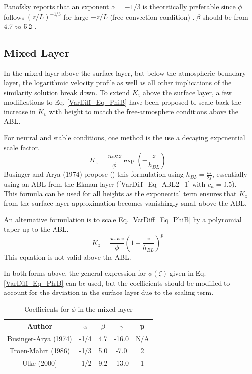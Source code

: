 Panofsky reports that an exponent $\alpha=-1/3$ is theoretically preferable
since $\phi$ follows $(z/L)^{-1/3}$ for large $-z/L$ (free-convection condition) \cite[p.134]{Panofsky1984}.
$\beta$ should be from 4.7 to 5.2 \cite[p.136]{Panofsky1984}.

\subsection{Mixed Layer}
In the mixed layer above the surface layer, but below the atmospheric boundary layer,
the logarithmic velocity profile as well as all other implications of the similarity
solution break down. To extend $K_v$ above the surface layer, a few modifications to
Eq. \ref{VarDiff_Eq_PhiB} have been proposed to scale back the increase in $K_v$ with
height to match the free-atmosphere conditions above the ABL.

For neutral and stable conditions, one method is the use a decaying exponential scale
factor.
\begin{equation}\label{VarDiff_Eq_Kz_Mixed_Exp}
K_z = \frac{u_{*} \kappa z}{\phi} \exp \left( -\frac{z}{h_{BL}} \right)
\end{equation}
Businger and Arya (1974) propose (\cite[p.872]{Seinfeld2006})
this formulation using $h_{BL}=\frac{u_*}{2 f}$, essentially
using an ABL from the Ekman layer (\ref{VarDiff_Eq_ABL2_1} with $c_n=0.5$).
This formula can be used for all heights as the exponential
term ensures that $K_z$ from the surface layer approximation becomes vanishingly
small above the ABL.

An alternative formulation is to scale Eq. \ref{VarDiff_Eq_PhiB} by a polynomial taper
up to the ABL.
\begin{equation}\label{VarDiff_Eq_Kz_Mixed_Poly}
K_z = \frac{u_{*} \kappa z}{\phi} \left( 1-\frac{z}{h_{BL}} \right)^p
\end{equation}
This equation is not valid above the ABL.

In both forms above, the general expression for $\phi(\zeta)$ given in Eq. \ref{VarDiff_Eq_PhiB}
can be used, but the coefficients should be modified to account for the deviation in the
surface layer due to the scaling term.

\small
\begin{table}[htbp]
\begin{center}
\begin{tabular}{| c | c | c | c | c |}
\hline
Author & $\alpha$ & $\beta$ & $\gamma$ & p \\
\hline
Businger-Arya (1974)     & -1/4 & 4.7 & -16.0 & N/A \\
Troen-Mahrt (1986) \cite{Troen1986}      & -1/3 & 5.0 & -7.0  & 2 \\
Ulke (2000)        \cite{Ulke2000}      & -1/2 & 9.2 & -13.0 & 1 \\
\hline
\end{tabular}
\caption{\label{tab:VarDiff_Kz_coeffABL}Coefficients for $\phi$ in the mixed layer}
\end{center}
\end{table}
\normalsize

